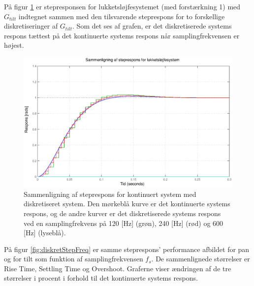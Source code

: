 På figur \ref{fig:diskretTiltStep} er stepresponsen for lukketsløjfesystemet (med forstærkning 1)
med \(G_{tilt}\) indtegnet sammen med den tilsvarende steprespons for to forskellige diskretiseringer
af \(G_{tilt}\). Som det ses af grafen, er det diskretiserede systems respons tættest
på det kontinuerte systems respons når samplingfrekvensen er højest.
\begin{figure}[!th]
\centering
	\includegraphics[width=1\textwidth]{./graphics/diskretTiltStep.eps}
\caption[Sammenligning af steprespons for kontinuert system med diskretiseret system]
{Sammenligning af steprespons for kontinuert system med diskretiseret system.
Den mørkeblå kurve er det kontinuerte systems respons,
og de andre kurver er det diskretiserede systems respons ved en samplingfrekvens på
120 [Hz] (grøn), 240 [Hz] (rød) og 600 [Hz] (lyseblå).}
\label{fig:diskretTiltStep}
\end{figure}
På figur \ref{fig:diskretStepFreq} er samme steprespons' performance afbildet
for pan og for tilt som funktion af samplingfrekvensen \(f_s\).
De sammenlignede størrelser er Rise Time, Settling Time og Overshoot.
Graferne viser ændringen af de tre størrelser i procent i forhold til det kontinuerte systems respons.
